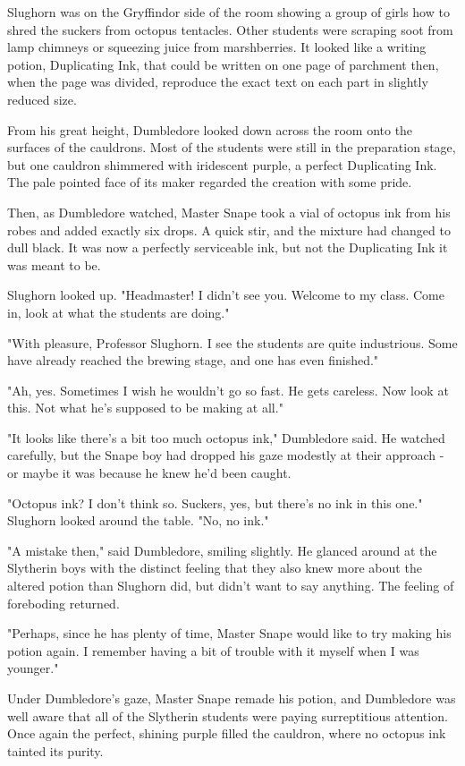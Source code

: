 \documentclass[a4paper,11pt]{article}
\begin{document}
Slughorn was on the Gryffindor side of the room showing a group of girls how to shred the suckers from octopus tentacles. Other students were scraping soot from lamp chimneys or squeezing juice from marshberries. It looked like a writing potion, Duplicating Ink, that could be written on one page of parchment then, when the page was divided, reproduce the exact text on each part in slightly reduced size.

From his great height, Dumbledore looked down across the room onto the surfaces of the cauldrons. Most of the students were still in the preparation stage, but one cauldron shimmered with iridescent purple, a perfect Duplicating Ink. The pale pointed face of its maker regarded the creation with some pride.

Then, as Dumbledore watched, Master Snape took a vial of octopus ink from his robes and added exactly six drops. A quick stir, and the mixture had changed to dull black. It was now a perfectly serviceable ink, but not the Duplicating Ink it was meant to be.

Slughorn looked up. "Headmaster! I didn't see you. Welcome to my class. Come in, look at what the students are doing."

"With pleasure, Professor Slughorn. I see the students are quite industrious. Some have already reached the brewing stage, and one has even finished."

"Ah, yes. Sometimes I wish he wouldn't go so fast. He gets careless. Now look at this. Not what he's supposed to be making at all."

"It looks like there's a bit too much octopus ink," Dumbledore said. He watched carefully, but the Snape boy had dropped his gaze modestly at their approach - or maybe it was because he knew he'd been caught.

"Octopus ink? I don't think so. Suckers, yes, but there's no ink in this one." Slughorn looked around the table. "No, no ink."

"A mistake then," said Dumbledore, smiling slightly. He glanced around at the Slytherin boys with the distinct feeling that they also knew more about the altered potion than Slughorn did, but didn't want to say anything. The feeling of foreboding returned.

"Perhaps, since he has plenty of time, Master Snape would like to try making his potion again. I remember having a bit of trouble with it myself when I was younger."

Under Dumbledore's gaze, Master Snape remade his potion, and Dumbledore was well aware that all of the Slytherin students were paying surreptitious attention. Once again the perfect, shining purple filled the cauldron, where no octopus ink tainted its purity.
\end{document}
